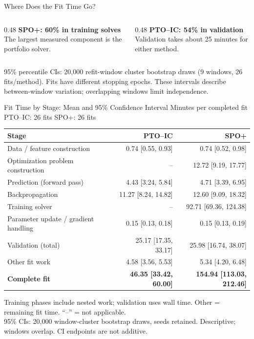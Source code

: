 \documentclass[aspectratio=169,xcolor=dvipsnames]{beamer}
\begin{document}
\begin{frame}{Where Does the Fit Time Go?}
    \vspace{7pt}
    \begin{columns}[T,onlytextwidth]
        \begin{column}{0.48\textwidth}
            \textbf{SPO+: 60\% in training solves}\\[3pt]
            \small The largest measured component is the portfolio solver.
        \end{column}
        \begin{column}{0.48\textwidth}
            \textbf{PTO--IC: 54\% in validation}\\[3pt]
            \small Validation takes about 25 minutes for either method.
        \end{column}
    \end{columns}
    \vspace{8pt}
    \raggedright\scriptsize
    95\% percentile CIs: 20,000 refit-window cluster bootstrap draws (9 windows, 26 fits/method).
    Fits have different stopping epochs. These intervals describe between-window variation; overlapping windows limit independence.
\end{frame}

\begin{frame}{Fit Time by Stage: Mean and 95\% Confidence Interval}
    \small Minutes per completed fit \hfill PTO--IC: 26 fits \quad SPO+: 26 fits
    \vspace{5pt}
    \begin{center}
    \renewcommand{\arraystretch}{1.02}
    \begin{tabular}{l r r}
    \toprule
    \textbf{Stage} & \textbf{PTO--IC} & \textbf{SPO+} \\
    \midrule
Data / feature construction & 0.74 [0.55, 0.93] & 0.74 [0.52, 0.98] \\
Optimization problem construction & -- & 12.72 [9.19, 17.77] \\
Prediction (forward pass) & 4.43 [3.24, 5.84] & 4.71 [3.39, 6.95] \\
Backpropagation & 11.27 [8.24, 14.82] & 12.60 [9.09, 18.32] \\
Training solver & -- & 92.71 [69.36, 124.38] \\
Parameter update / gradient handling & 0.15 [0.13, 0.18] & 0.15 [0.13, 0.19] \\
Validation (total) & 25.17 [17.35, 33.17] & 25.98 [16.74, 38.07] \\
Other fit work & 4.58 [3.56, 5.53] & 5.34 [4.20, 6.48] \\
    \midrule
    \textbf{Complete fit} & \textbf{46.35 [33.42, 60.00]} & \textbf{154.94 [113.03, 212.46]} \\
    \bottomrule
    \end{tabular}
    \end{center}
    \vspace{3pt}
    \scriptsize
    Training phases include nested work; validation uses wall time. Other = remaining fit time. ``--'' = not applicable.\\[2pt]
    95\% CIs: 20,000 window-cluster bootstrap draws, seeds retained. Descriptive; windows overlap. CI endpoints are not additive.
\end{frame}
\end{document}
